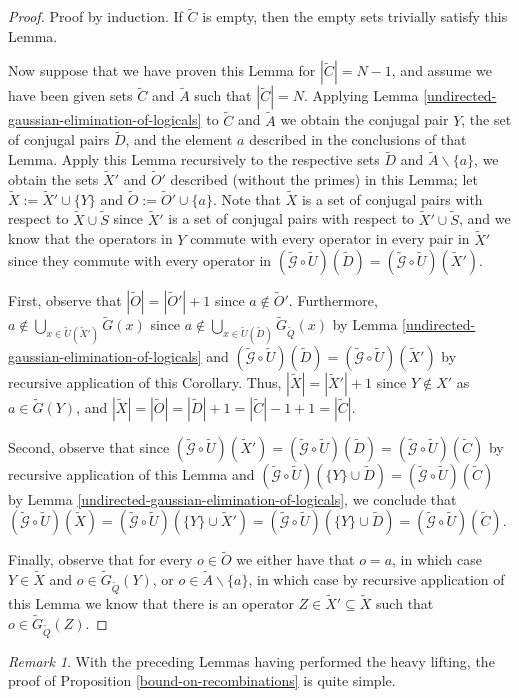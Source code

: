 \documentclass{amsbook}
\theoremstyle{plain}
\theoremstyle{definition}
\theoremstyle{remark}
\newtheorem{remark}{Remark}
\newcommand{\set}{\tilde}
\newcommand{\genfun}{\tilde{\mathcal{G}}}
\begin{document}
\begin{proof}
Proof by induction.  If $\set C$ is empty, then the empty sets trivially satisfy this Lemma.

Now suppose that we have proven this Lemma for $|\set C|=N-1$, and assume we have been given sets $\set C$ and $\set A$ such that $|\set C|=N$.  Applying Lemma \ref{undirected-gaussian-elimination-of-logicals} to $\set C$ and $\set A$ we obtain the conjugal pair $Y$,  the set of conjugal pairs $\set D$, and the element $a$ described in the conclusions of that Lemma.  Apply this Lemma recursively to the respective sets $\set D$ and $\set A\backslash\{a\}$, we obtain the sets $\set X'$ and $\set O'$ described (without the primes) in this Lemma; let $\set X := \set X'\cup\{Y\}$ and $\set O:=\set O'\cup\{a\}$.  Note that $\set X$ is a set of conjugal pairs with respect to $\set X\cup\set S$ since $\set X'$ is a set of conjugal pairs with respect to $\set X'\cup\set S$, and we know that the operators in $Y$ commute with every operator in every pair in $\set X'$ since they commute with every operator in $(\genfun\circ\set U)(\set D)=(\genfun\circ\set U)(\set X')$.

First, observe that $|\set O|=|\set O'|+1$ since $a\notin \set O'$.  Furthermore, $a\notin \bigcup_{x\in \set U(\set X')} \set G(x)$ since $a\notin \bigcup_{x\in \set U(\set D)} \set G_{\set Q}(x)$ by Lemma \ref{undirected-gaussian-elimination-of-logicals} and $(\genfun\circ\set U)(\set D)=(\genfun\circ\set U)(\set X')$ by recursive application of this Corollary.  Thus, $|\set X|=|\set X'|+1$ since $Y\notin X'$ as $a\in\set G(Y)$, and $|\set X|=|\set O|=|\set D|+1=|\set C|-1+1=|\set C|$.

Second, observe that since $(\genfun\circ\set U)(\set X')=(\genfun\circ\set U)(\set D)=(\genfun\circ\set U)(\set C)$ by recursive application of this Lemma and $(\genfun\circ\set U)(\{Y\}\cup\set D)=(\genfun\circ\set U)(\set C)$ by Lemma \ref{undirected-gaussian-elimination-of-logicals}, we conclude that $(\genfun\circ\set U)(\set X) = (\genfun\circ\set U)(\{Y\}\cup\set X') = (\genfun\circ\set U)(\{Y\}\cup\set D) = (\genfun\circ\set U)(\set C)$.

Finally, observe that for every $o\in\set O$ we either have that $o=a$, in which case $Y\in\set X$ and $o\in\set G_{\set Q}(Y)$, or $o\in \set A\backslash\{a\}$, in which case by recursive application of this Lemma we know that there is an operator $Z\in \set X'\subseteq \set X$ such that $o\in\set G_{\set Q}(Z)$.
\end{proof}
\begin{remark}
With the preceding Lemmas having performed the heavy lifting, the proof of Proposition \ref{bound-on-recombinations} is quite simple.
\end{remark}
\end{document}
